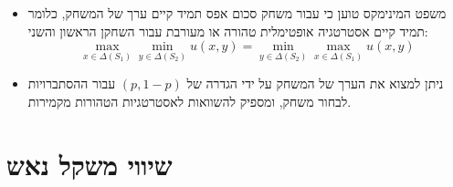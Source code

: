 \documentclass{tstextbook}
\begin{document}
\begin{summary}
  \begin{itemize}
    \item משפט המינימקס טוען כי עבור משחק סכום אפס תמיד קיים ערך של המשחק, כלומר תמיד קיים אסטרטגיה אופטימלית טהורה או מעורבת עבור השחקן הראשון והשני:
$$\operatorname*{max}_{x\in\Delta(S_{1})}\operatorname*{min}_{y\in\Delta(S_{2})}u(x,y)=\operatorname*{min}_{y\in\Delta(S_{2})}\operatorname*{max}_{x\in\Delta(S_{1})}u(x,y)$$
    \item ניתן למצוא את הערך של המשחק על ידי הגדרה של \((p,1-p)\) עבור ההסתברויות לבחור משחק, ומספיק להשוואות לאסטרטגיות הטהורות מקמירות.
  \end{itemize}
\end{summary}
\section{שיווי משקל נאש}
\end{document}
